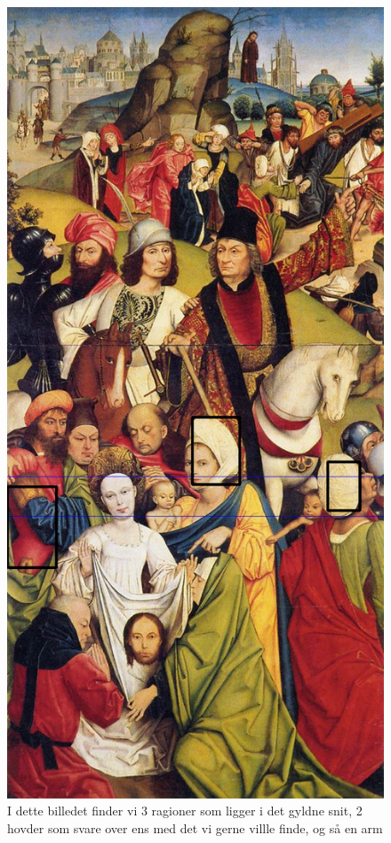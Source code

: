 \begin{figure}[h!!]
	\begin{center}
		\includegraphics[scale=0.35,angle=0]{afsnit/afprovning/billeder/BBCarruingcut2.png}
	\end{center}
	\caption[]{I dette billedet finder vi 3 ragioner som ligger i det
	gyldne snit, 2 hovder som svare over ens med det vi gerne villle
	finde, og så en arm}
	\label{BBCarruingcut2}
\end{figure}


